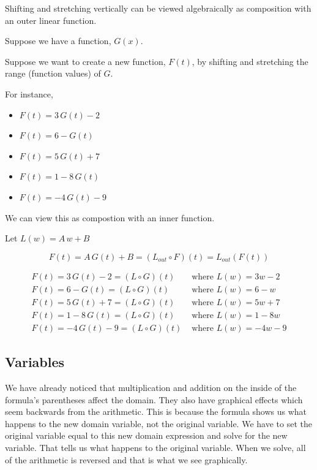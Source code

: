 \documentclass{ximera}
\begin{document}
Shifting and stretching vertically can be viewed algebraically as composition with an outer linear function.



Suppose we have a function, $G(x)$. 

Suppose we want to create a new function, $F(t)$, by shifting and stretching the range (function values) of $G$.


For instance, 
\begin{itemize}
\item $F(t) = 3 \, G(t)-2$
\item $F(t) = 6-G(t)$
\item $F(t) = 5 \, G(t)+7$
\item $F(t) = 1 - 8 \, G(t)$
\item $F(t) = -4 \, G(t)-9$
\end{itemize}


We can view this as compostion with an inner function.

Let $L(w) = A \, w + B$


\[ F(t) = A \, G(t) + B = (L_{out} \circ F)(t) = L_{out}(F(t)) \]




\begin{align*}
F(t) = 3 \, G(t)-2 = (L \circ G)(t)  & \text{ where } L(w) = 3w-2 \\
F(t) = 6-G(t) = (L \circ G)(t)   & \text{ where } L(w) = 6-w    \\
F(t) = 5 \, G(t)+7 = (L \circ G)(t)  & \text{ where } L(w) = 5w+7   \\
F(t) = 1 - 8 \, G(t) = (L \circ G)(t)  & \text{ where } L(w) = 1-8w    \\
F(t) = -4 \, G(t)-9 = (L \circ G)(t) & \text{ where } L(w) = -4w-9   
\end{align*}






\subsection*{Variables}












We have already noticed that multiplication and addition on the inside of the formula's parentheses affect the domain.  They also have graphical effects which seem backwards from the arithmetic.  This is because the formula shows us what happens to the new domain variable, not the original variable.  We have to set the original variable equal to this new domain expression and solve for the new variable.  That tells us what happens to the original variable.  When we solve, all of the arithmetic is reversed and that is what we see graphically.
\end{document}
